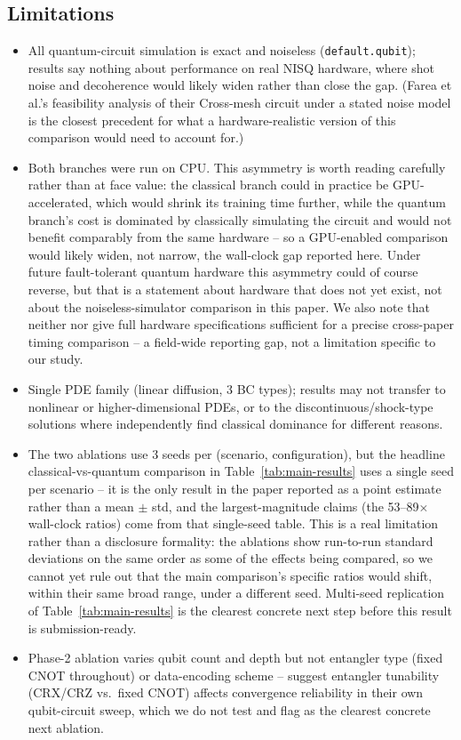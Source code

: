 \subsection{Limitations}
\begin{itemize}
  \item All quantum-circuit simulation is exact and noiseless
    (\texttt{default.qubit}); results say nothing about performance on
    real NISQ hardware, where shot noise and decoherence would likely
    widen rather than close the gap. (Farea et al.'s feasibility analysis
    of their Cross-mesh circuit under a stated noise model is the closest
    precedent for what a hardware-realistic version of this comparison
    would need to account for.)
  \item Both branches were run on CPU. This asymmetry is worth reading
    carefully rather than at face value: the classical branch could in
    practice be GPU-accelerated, which would shrink its training time
    further, while the quantum branch's cost is dominated by classically
    simulating the circuit and would not benefit comparably from the same
    hardware -- so a GPU-enabled comparison would likely widen, not narrow,
    the wall-clock gap reported here. Under future fault-tolerant quantum
    hardware this asymmetry could of course reverse, but that is a
    statement about hardware that does not yet exist, not about the
    noiseless-simulator comparison in this paper. We also note that
    neither \citet{farea2025qcpinn} nor \citet{hqpinn2025flow} give full
    hardware specifications sufficient for a precise cross-paper timing
    comparison -- a field-wide reporting gap, not a limitation specific to
    our study.
  \item Single PDE family (linear diffusion, 3 BC types); results may not
    transfer to nonlinear or higher-dimensional PDEs, or to the
    discontinuous/shock-type solutions where \citet{hqpinn2025flow}
    independently find classical dominance for different reasons.
  \item The two ablations use 3 seeds per (scenario, configuration), but
    the headline classical-vs-quantum comparison in
    Table~\ref{tab:main-results} uses a single seed per scenario -- it is
    the only result in the paper reported as a point estimate rather than
    a mean $\pm$ std, and the largest-magnitude claims (the 53--89$\times$
    wall-clock ratios) come from that single-seed table. This is a real
    limitation rather than a disclosure formality: the ablations show
    run-to-run standard deviations on the same order as some of the
    effects being compared, so we cannot yet rule out that the main
    comparison's specific ratios would shift, within their same broad
    range, under a different seed. Multi-seed replication of
    Table~\ref{tab:main-results} is the clearest concrete next step before
    this result is submission-ready.
  \item Phase-2 ablation varies qubit count and depth but not entangler
    type (fixed CNOT throughout) or data-encoding scheme --
    \citet{farea2025qcpinn} suggest entangler tunability (CRX/CRZ vs.\
    fixed CNOT) affects convergence reliability in their own qubit-circuit
    sweep, which we do not test and flag as the clearest concrete next
    ablation.
\end{itemize}
